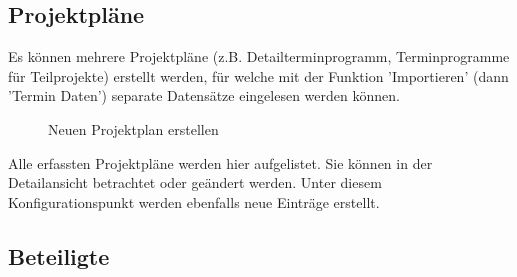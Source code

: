 \subsection{Projektpläne}

Es können mehrere Projektpläne (z.B. Detailterminprogramm, Terminprogramme für Teilprojekte) erstellt werden, für welche mit der Funktion 'Importieren' (dann  'Termin Daten') separate Datensätze eingelesen werden können.

\begin{figure}[H]
\caption{Neuen Projektplan erstellen}
\end{figure}

Alle erfassten Projektpläne werden hier aufgelistet. Sie können in der Detailansicht betrachtet oder geändert werden. Unter diesem Konfigurationspunkt werden ebenfalls neue Einträge erstellt.

\subsection{Beteiligte}
\label{bkm:Ref2018071602}

